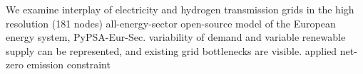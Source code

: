 We examine interplay of electricity and hydrogen transmission grids in the high
resolution (181 nodes) all-energy-sector open-source model of the European
energy system, PyPSA-Eur-Sec.
variability of demand and variable renewable supply can be represented, and existing grid bottlenecks are visible.
applied net-zero emission constraint
